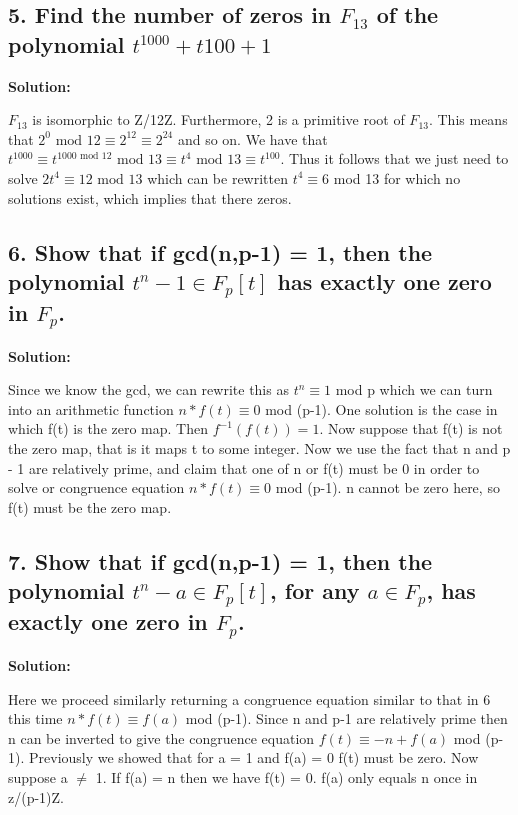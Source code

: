 \documentclass{article}
\begin{document}
\begin{spacing}{1.1}
\vfill

\subsection{5.  Find the number of zeros in $F_{13}$ of the polynomial $t^{1000} + t{100} + 1$}

\textbf{Solution: }

$F_{13}$ is isomorphic to Z/12Z.  Furthermore, 2 is a primitive root of $F_{13}$.  This means that $2^0 \text{ mod } 12 \equiv 2^{12} \equiv 2^{24}$ and so on.  We have that $t^{1000} \equiv t^{1000 \text{ mod } 12} \text{ mod } 13 \equiv t^4 \text{ mod } 13 \equiv t^{100}$.  Thus it follows that we just need to solve $2t^4 \equiv 12 \text{ mod } 13$ which can be rewritten $t^4 \equiv 6$ mod 13 for which no solutions exist, which implies that there zeros.  

\vfill

\subsection{6.  Show that if gcd(n,p-1) = 1, then the polynomial $t^n - 1 \in F_p[t]$ has exactly one zero in $F_p$.}

\textbf{Solution: }

Since we know the gcd, we can rewrite this as $t^n \equiv 1$ mod p which we can turn into an arithmetic function $n * f(t) \equiv 0 $ mod (p-1).  One solution is the case in which f(t) is the zero map.  Then $f^{-1}(f(t)) = 1$.  Now suppose that f(t) is not the zero map, that is it maps t to some integer.  Now we use the fact that n and p - 1 are relatively prime, and claim that one of n or f(t) must be 0 in order to solve or congruence equation $n * f(t) \equiv 0 $ mod (p-1).  n cannot be zero here, so f(t) must be the zero map.  

\vfill

\subsection{7.  Show that if gcd(n,p-1) = 1, then the polynomial $t^n - a \in F_p[t]$, for any $a \in F_p$, has exactly one zero in $F_p$.  }

\textbf{Solution: }

Here we proceed similarly returning a congruence equation similar to that in 6 this time $n * f(t) \equiv f(a)$ mod (p-1).  Since n and p-1 are relatively prime then n can be inverted to give the congruence equation $f(t) \equiv -n + f(a)$ mod (p-1).  Previously we showed that for a = 1 and f(a) = 0 f(t) must be zero.  Now suppose a $\neq$ 1.  If f(a) = n then we have f(t) = 0.  f(a) only equals n once in z/(p-1)Z.  

\vfill

\end{spacing}
\end{document}
